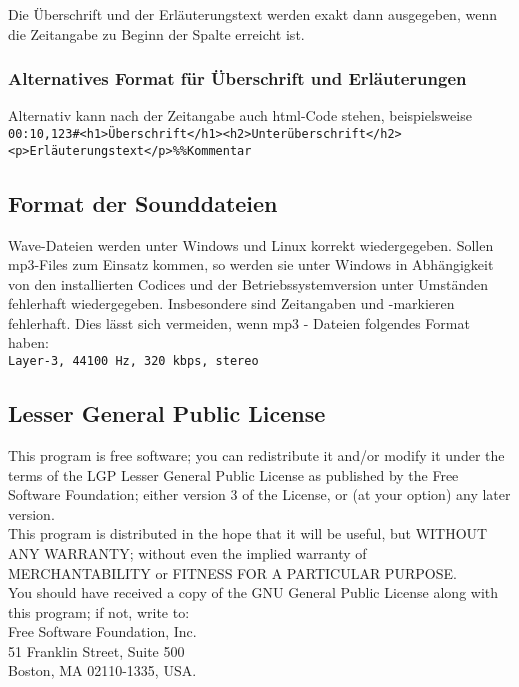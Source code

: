 \documentclass[a4paper,DIV=11
]{scrartcl}
\begin{document}
Die Überschrift und der Erläuterungstext werden exakt dann ausgegeben,
wenn die Zeitangabe zu Beginn der Spalte erreicht ist.

\hypertarget{alternatives-format-fuxfcr-uxfcberschrift-und-erluxe4uterungen}{%
\subsubsection{Alternatives Format für Überschrift und
Erläuterungen}\label{alternatives-format-fuxfcr-uxfcberschrift-und-erluxe4uterungen}}

Alternativ kann nach der Zeitangabe auch html-Code stehen,
beispielsweise\\
{\footnotesize
\texttt{00:10,123\#\textless{}h1\textgreater{}Überschrift\textless{}/h1\textgreater{}\textless{}h2\textgreater{}Unterüberschrift\textless{}/h2\textgreater{}\textless{}p\textgreater{}Erläuterungstext\textless{}/p\textgreater{}\%\%Kommentar}}

\hypertarget{format-der-sounddateien}{%
\subsection{Format der Sounddateien}\label{format-der-sounddateien}}

Wave-Dateien werden unter Windows und Linux korrekt wiedergegeben.
Sollen mp3-Files zum Einsatz kommen, so werden sie unter Windows in
Abhängigkeit von den installierten Codices und der Betriebssystemversion
unter Umständen fehlerhaft wiedergegeben. Insbesondere sind Zeitangaben
und -markieren fehlerhaft. Dies lässt sich vermeiden, wenn mp3 - Dateien folgendes Format haben:\\
\texttt{Layer-3,\ 44100\ Hz,\ 320\ kbps,\ stereo}

\hypertarget{lizenz}{%
\subsection{Lesser General Public License}\label{lizenz}}

This program is free software; you can redistribute it and/or modify it
under the terms of the LGP Lesser General Public License as published by
the Free Software Foundation; either version 3 of the License, or (at
your option) any later version.\\
This program is distributed in the hope that it will be useful, but
WITHOUT ANY WARRANTY; without even the implied warranty of
MERCHANTABILITY or FITNESS FOR A PARTICULAR PURPOSE.\\
You should have received a copy of the GNU General Public License along
with this program; if not, write to:\\
Free Software Foundation, Inc.\\
51 Franklin Street, Suite 500\\
Boston, MA 02110-1335, USA.
\end{document}
